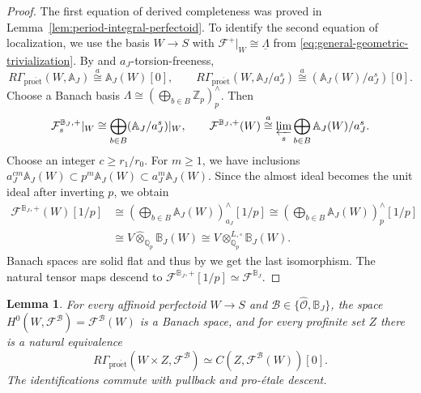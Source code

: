 \documentclass[11pt]{article}
\newtheorem{lemma}[theorem]{Lemma}
\theoremstyle{definition}
\newcommand{\Qp}{\mathbb Q_p}
\newcommand{\Zp}{\mathbb Z_p}
\newcommand{\proet}{\mathrm{pro\acute et}}
\newcommand{\acong}{\mathrel{\overset{a}{\cong}}}
\begin{document}
\begin{proof}
The first equation of derived completeness was proved in Lemma~\ref{lem:period-integral-perfectoid}.
To identify the second equation of localization, we use the basis $W\to S$ with
\(\mathcal F^+|_W\cong\underline\Lambda\) from
\eqref{eq:general-geometric-trivialization}.
By \cite[Proposition~4.7]{BoscoDrinfeld}
and $a_J$-torsion-freeness,
\[
 R\Gamma_{\proet}(W,\mathbb A_J)\acong \mathbb A_J(W)[0],
 \qquad
 R\Gamma_{\proet}(W,\mathbb A_J/a_J^s)
 \acong(\mathbb A_J(W)/a_J^s)[0].
\]
Choose a Banach basis
$\Lambda\cong(\bigoplus_{b\in B}\Zp)^\wedge_p$.
Then
\[
 \mathcal F_s^{\mathbb B_J,+}|_W
 \cong\bigoplus_{b\in B}(\mathbb A_J/a_J^s)|_W,\qquad
 \mathcal F^{\mathbb B_J,+}(W)
 \acong\varprojlim_s\bigoplus_{b\in B}\mathbb A_J(W)/a_J^s.
\]
Choose an integer $c\ge r_1/r_0$.  For $m\ge1$,
we have inclusions
$a_J^{cm}\mathbb A_J(W)\subset p^m\mathbb A_J(W)\subset a_J^m\mathbb A_J(W)$.
Since the almost ideal becomes the unit ideal after inverting
$p$, we obtain
\begin{align*}
 \mathcal F^{\mathbb B_J,+}(W)[1/p]
 &\cong\left(\bigoplus_{b\in B}\mathbb A_J(W)\right)^\wedge_{a_J}[1/p]\cong\left(\bigoplus_{b\in B}\mathbb A_J(W)\right)^\wedge_p[1/p]\\
 &\cong V\widehat\otimes_{\Qp}\mathbb B_J(W)
  \cong V\otimes_{\Qp}^{L,\square}\mathbb B_J(W).
\end{align*}
Banach spaces are solid flat and thus by
\cite[Corollary~A.28 and Proposition~A.68]{BoscoDrinfeld}
we get the last isomorphism.  The natural tensor maps descend to
$\mathcal F^{\mathbb B_J,+}[1/p]\simeq\mathcal F^{\mathbb B_J}$.
\end{proof}


\begin{lemma}%
\label{lem:general-geometric-perfectoid-parameters}
\label{lem:period-coefficient-acyclicity}
For every affinoid perfectoid \(W\to S\) and
\(\mathscr B\in\{\widehat{\mathscr O},\mathbb B_J\}\), the space
\(H^0(W,\mathcal F^{\mathscr B})=\mathcal F^{\mathscr B}(W)\)
is a Banach space, and for every profinite set \(Z\) there is a natural
equivalence
\begin{equation}\label{eq:general-perfectoid-parameters}
 R\Gamma_{\proet}(W\times Z,\mathcal F^{\mathscr B})
 \simeq C(Z,\mathcal F^{\mathscr B}(W))[0].
\end{equation}
The identifications commute with pullback and pro-\'etale descent.
\end{lemma}
\end{document}
